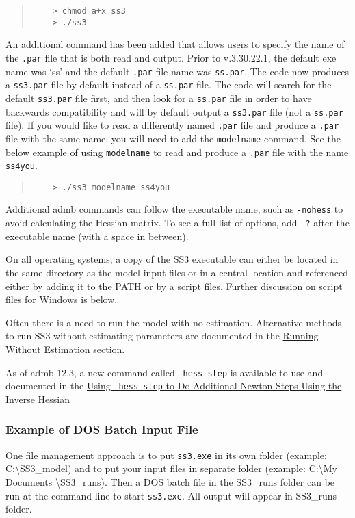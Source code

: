\begin{quote}
	\begin{verbatim}
	> chmod a+x ss3
	> ./ss3
	\end{verbatim}
\end{quote}

An additional command has been added that allows users to specify the name of the \texttt{.par} file that is both read and output. Prior to v.3.30.22.1, the default exe name was `ss' and the default \texttt{.par} file name was \texttt{ss.par}. The code now produces a \texttt{ss3.par} file by default instead of a \texttt{ss.par} file. The code will search for the default \texttt{ss3.par} file first, and then look for a \texttt{ss.par} file in order to have backwards compatibility and will by default output a \texttt{ss3.par} file (not a \texttt{ss.par} file). If you would like to read a differently named \texttt{.par} file and produce a \texttt{.par} file with the same name, you will need to add the \texttt{modelname} command. See the below example of using \texttt{modelname} to read and produce a \texttt{.par} file with the name \texttt{ss4you}.

\begin{quote}
	\begin{verbatim}
	> ./ss3 modelname ss4you
	\end{verbatim}
\end{quote}

Additional \gls{admb} commands can follow the executable name, such as \texttt{-nohess} to avoid calculating the Hessian matrix. To see a full list of options, add \texttt{-?} after the executable name (with a space in between).

On all operating systems, a copy of the SS3 executable can either be located in the same directory as the model input files or in a central location and referenced either by adding it to the PATH or by a script files. Further discussion on script files for Windows is below.

Often there is a need to run the model with no estimation. Alternative methods to run SS3 without estimating parameters are documented in the \hyperlink{NoEst}{Running Without Estimation section}. 

As of \gls{admb} 12.3, a new command called \texttt{-hess\_step} is available to use and documented in the \hyperlink{hess-step}{Using \texttt{-hess\_step} to Do Additional Newton Steps Using the Inverse Hessian}

\hypertarget{DOS}{}
\subsubsection[Example of DOS Batch Input File]{\protect\hyperlink{DOS}{Example of DOS Batch Input File}}
One file management approach is to put \texttt{ss3.exe} in its own folder (example:  C:\textbackslash SS3\_model) and to put your input files in separate folder (example:  C:\textbackslash My Documents \textbackslash SS3\_runs). Then a DOS batch file in the SS3\_runs folder can be run at the command line to start \texttt{ss3.exe}. All output will appear in SS3\_runs folder.

